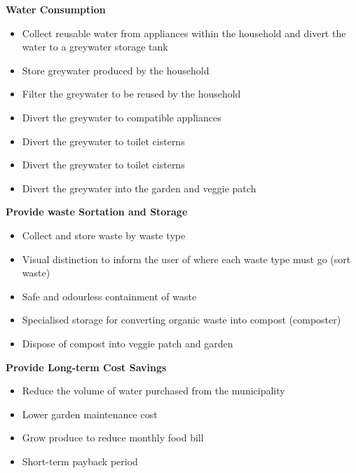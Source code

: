 \documentclass[a4paper,11pt,fleqn]{report}
\begin{document}
\textbf{Water Consumption}
\begin{itemize}
\item Collect reusable water from appliances within the household and divert the water to a greywater storage tank 
\item Store greywater produced by the household
\item Filter the greywater to be reused by the household
\item Divert the greywater to compatible appliances 
\item Divert the greywater to toilet cisterns
\item Divert the greywater to toilet cisterns
\item Divert the greywater into the garden and veggie patch
\end{itemize}
\medskip
\textbf{Provide waste Sortation and Storage}
\begin{itemize}
\item Collect and store waste by waste type
\item Visual distinction to inform the user of where each waste type must go (sort waste)
\item Safe and odourless containment of waste
\item Specialised storage for converting organic waste into compost (composter)
\item Dispose of compost into veggie patch and garden
\end{itemize}
\medskip
\textbf{Provide Long-term Cost Savings}
\begin{itemize}
\item Reduce the volume of water purchased from the municipality
\item Lower garden maintenance cost
\item Grow produce to reduce monthly food bill 
\item Short-term payback period
\end{itemize}
\end{document}
